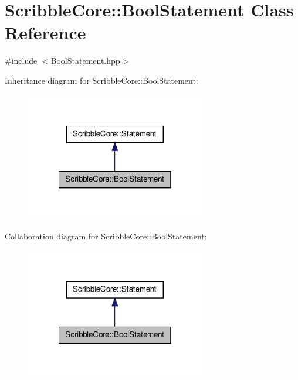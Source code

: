 \hypertarget{class_scribble_core_1_1_bool_statement}{\section{Scribble\-Core\-:\-:Bool\-Statement Class Reference}
\label{class_scribble_core_1_1_bool_statement}
}


{\ttfamily \#include $<$Bool\-Statement.\-hpp$>$}



Inheritance diagram for Scribble\-Core\-:\-:Bool\-Statement\-:
\nopagebreak
\begin{figure}[H]
\begin{center}
\leavevmode
\includegraphics[width=222pt]{class_scribble_core_1_1_bool_statement__inherit__graph}
\end{center}
\end{figure}


Collaboration diagram for Scribble\-Core\-:\-:Bool\-Statement\-:
\nopagebreak
\begin{figure}[H]
\begin{center}
\leavevmode
\includegraphics[width=222pt]{class_scribble_core_1_1_bool_statement__coll__graph}
\end{center}
\end{figure}
